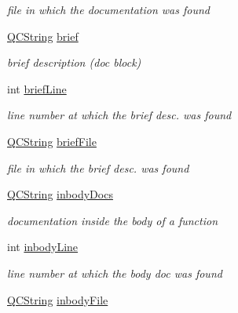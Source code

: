 \begin{DoxyCompactItemize}
\begin{DoxyCompactList}\small\item\em file in which the documentation was found \end{DoxyCompactList}\item 
\hypertarget{class_entry_ae58e255b2a13ba38c9d7cbe225ed91cc}{\hyperlink{class_q_c_string}{Q\-C\-String} \hyperlink{class_entry_ae58e255b2a13ba38c9d7cbe225ed91cc}{brief}}\label{class_entry_ae58e255b2a13ba38c9d7cbe225ed91cc}

\begin{DoxyCompactList}\small\item\em brief description (doc block) \end{DoxyCompactList}\item 
\hypertarget{class_entry_a6391b011b6da7907bebc9c8cee6b2754}{int \hyperlink{class_entry_a6391b011b6da7907bebc9c8cee6b2754}{brief\-Line}}\label{class_entry_a6391b011b6da7907bebc9c8cee6b2754}

\begin{DoxyCompactList}\small\item\em line number at which the brief desc. was found \end{DoxyCompactList}\item 
\hypertarget{class_entry_af327d9fd2f66ee986a26518240cae024}{\hyperlink{class_q_c_string}{Q\-C\-String} \hyperlink{class_entry_af327d9fd2f66ee986a26518240cae024}{brief\-File}}\label{class_entry_af327d9fd2f66ee986a26518240cae024}

\begin{DoxyCompactList}\small\item\em file in which the brief desc. was found \end{DoxyCompactList}\item 
\hypertarget{class_entry_a40e93805b4cee362f6244037609e8fcd}{\hyperlink{class_q_c_string}{Q\-C\-String} \hyperlink{class_entry_a40e93805b4cee362f6244037609e8fcd}{inbody\-Docs}}\label{class_entry_a40e93805b4cee362f6244037609e8fcd}

\begin{DoxyCompactList}\small\item\em documentation inside the body of a function \end{DoxyCompactList}\item 
\hypertarget{class_entry_a4e3cb6f22c256238cb85a53b53b58ecc}{int \hyperlink{class_entry_a4e3cb6f22c256238cb85a53b53b58ecc}{inbody\-Line}}\label{class_entry_a4e3cb6f22c256238cb85a53b53b58ecc}

\begin{DoxyCompactList}\small\item\em line number at which the body doc was found \end{DoxyCompactList}\item 
\hypertarget{class_entry_a1ee854f4b1e91af928cf49d00b3f757c}{\hyperlink{class_q_c_string}{Q\-C\-String} \hyperlink{class_entry_a1ee854f4b1e91af928cf49d00b3f757c}{inbody\-File}}\label{class_entry_a1ee854f4b1e91af928cf49d00b3f757c}


\end{DoxyCompactItemize}
